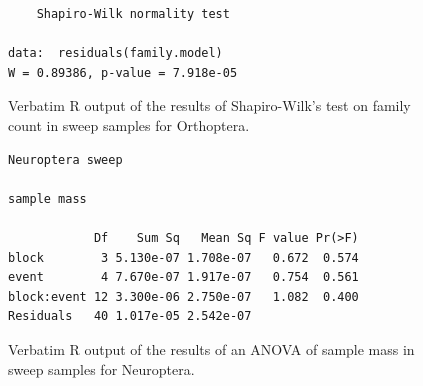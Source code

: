 \documentclass[10pt,letterpaper,twocolumn]{article}
\begin{document}
\begin{figure}[h]
	\lstset{numbers=left}
	\lstset{xleftmargin=5mm,framexleftmargin=5mm}
	\begin{lstlisting}
	Shapiro-Wilk normality test

data:  residuals(family.model)
W = 0.89386, p-value = 7.918e-05
	\end{lstlisting}
	\caption{Verbatim R output of the results of Shapiro-Wilk's test on family count in sweep samples for Orthoptera.}
	\label{fig:sweep_orthoptera_family_shapiro}
	\smallskip
	\nointerlineskip
	\hrulefill
\end{figure}

\begin{figure}[h]
	\lstset{numbers=left}
	\lstset{xleftmargin=5mm,framexleftmargin=5mm}
	\begin{lstlisting}
Neuroptera sweep 

sample mass 

            Df    Sum Sq   Mean Sq F value Pr(>F)
block        3 5.130e-07 1.708e-07   0.672  0.574
event        4 7.670e-07 1.917e-07   0.754  0.561
block:event 12 3.300e-06 2.750e-07   1.082  0.400
Residuals   40 1.017e-05 2.542e-07               
	\end{lstlisting}
	\caption{Verbatim R output of the results of an ANOVA of sample mass in sweep samples for Neuroptera.}
	\label{fig:sweep_neuroptera_mass_anova}
	\smallskip
	\nointerlineskip
	\hrulefill
\end{figure}
\end{document}
